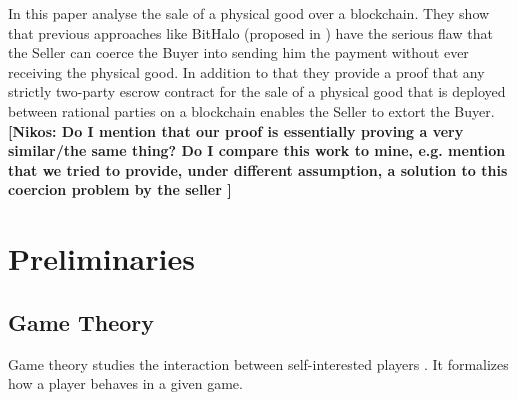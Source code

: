 \documentclass{cacthesis}
\newcommand{\authnote}[3]{{ \footnotesize \textbf{#1[#2: #3]~}}}
\newcommand{\niknote}[1]{\authnote{\color{red}}{Nikos}{#1}}
\begin{document}
In this paper \citeauthor{goharshady_irrationality_2021} analyse the sale of a physical good over a blockchain. They show that previous approaches like BitHalo (proposed in \cite{zimbeck_two_nodate}) have the serious flaw that the Seller can coerce the Buyer into sending him the payment without ever receiving the physical good. In addition to that they provide a proof that any strictly two-party escrow contract for the sale of a physical good that is deployed between rational parties on a blockchain enables the Seller to extort the Buyer. 
\niknote{Do I mention that our proof is essentially proving a very similar/the same thing? Do I compare this work to mine, e.g. mention that we tried to provide, under different assumption, a solution to this coercion problem by the seller }
\chapter{Preliminaries}
\label{cha:preliminaries}

\section{Game Theory}
Game theory studies the interaction between self-interested players \cite{leyton-brown_essentials_2008}. It formalizes how a player behaves in a given game.
\end{document}
